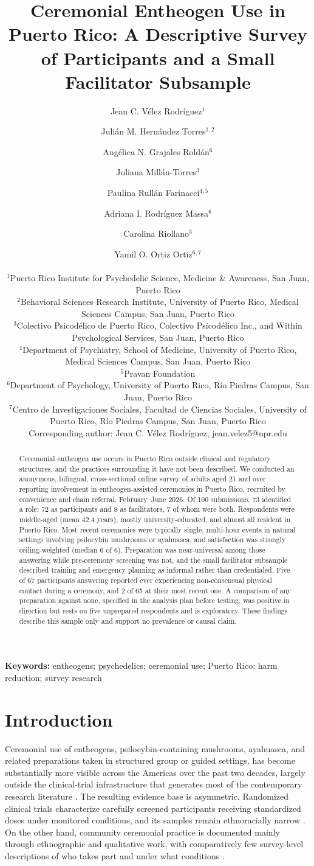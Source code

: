 \documentclass[12pt]{article}
\title{Ceremonial Entheogen Use in Puerto Rico: A Descriptive Survey of Participants
and a Small Facilitator Subsample}
\author{
  Jean C. V\'elez Rodr\'iguez$^{1}$ \and Juli\'an M. Hern\'andez Torres$^{1,2}$ \and
  Ang\'elica N. Grajales Rold\'an$^{6}$ \and Juliana Mill\'an-Torres$^{3}$ \and
  Paulina Rull\'an Farinacci$^{4,5}$ \and Adriana I. Rodr\'iguez Massa$^{6}$ \and
  Carolina Riollano$^{3}$ \and Yamil O. Ortiz Ortiz$^{6,7}$ \\[1em]
  \begin{minipage}{0.92\textwidth}\centering\small\setstretch{1.15}
  $^{1}$Puerto Rico Institute for Psychedelic Science, Medicine \& Awareness, San Juan, Puerto Rico \\
  $^{2}$Behavioral Sciences Research Institute, University of Puerto Rico, Medical Sciences Campus,
  San Juan, Puerto Rico \\
  $^{3}$Colectivo Psicod\'elico de Puerto Rico, Colectivo Psicod\'elico Inc., and Within Psychological
  Services, San Juan, Puerto Rico \\
  $^{4}$Department of Psychiatry, School of Medicine, University of Puerto Rico, Medical Sciences Campus,
  San Juan, Puerto Rico \\
  $^{5}$Pravan Foundation \\
  $^{6}$Department of Psychology, University of Puerto Rico, R\'io Piedras Campus, San Juan, Puerto Rico \\
  $^{7}$Centro de Investigaciones Sociales, Facultad de Ciencias Sociales, University of Puerto Rico,
  R\'io Piedras Campus, San Juan, Puerto Rico \\[0.5em]
  Corresponding author: Jean C. V\'elez Rodr\'iguez, jean.velez5@upr.edu
  \end{minipage}
}
\date{}
\begin{document}
\maketitle
\linenumbers

\begin{abstract}
\noindent
Ceremonial entheogen use occurs in Puerto Rico outside clinical and regulatory structures, and the
practices surrounding it have not been described. We conducted an anonymous, bilingual, cross-sectional
online survey of adults aged 21 and over reporting involvement in entheogen-assisted ceremonies in Puerto
Rico, recruited by convenience and chain referral, February--June 2026. Of 100 submissions, 73
identified a role: 72 as participants and 8 as facilitators, 7 of whom were both. Respondents were
middle-aged (mean 42.4 years), mostly university-educated, and almost all resident in Puerto Rico. Most
recent ceremonies were typically single, multi-hour events in natural settings involving psilocybin
mushrooms or ayahuasca, and satisfaction was strongly ceiling-weighted (median 6 of 6). Preparation was
near-universal among those answering while pre-ceremony screening was not, and the small facilitator
subsample described training and emergency planning as informal rather than credentialed. Five of 67
participants answering reported ever experiencing non-consensual physical contact during a ceremony, and 2
of 65 at their most recent one. A comparison of any preparation against none, specified in the analysis
plan before testing, was positive in direction but rests on five unprepared respondents and is exploratory.
These findings describe this sample only and support no prevalence or causal claim.
\end{abstract}

\noindent\textbf{Keywords:} entheogens; psychedelics; ceremonial use; Puerto Rico; harm reduction; survey research

\section{Introduction}

Ceremonial use of entheogens, psilocybin-containing mushrooms, ayahuasca, and related preparations taken
in structured group or guided settings, has become substantially more visible across the Americas over the
past two decades, largely outside the clinical-trial infrastructure that generates most of the contemporary
research literature \citep{carvalho2025scoping}. The resulting evidence base is asymmetric. Randomized
clinical trials characterize carefully screened participants receiving standardized doses under monitored
conditions, and its samples remain ethnoracially narrow
\citep{hughes2024ethnoracial,marcus2026psychedelics}. On the other hand, community ceremonial practice is
documented mainly through ethnographic and qualitative work, with comparatively few survey-level
descriptions of who takes part and under what conditions
\citep{carvalho2025scoping,teixeira2026ayahuasca}.
\end{document}
